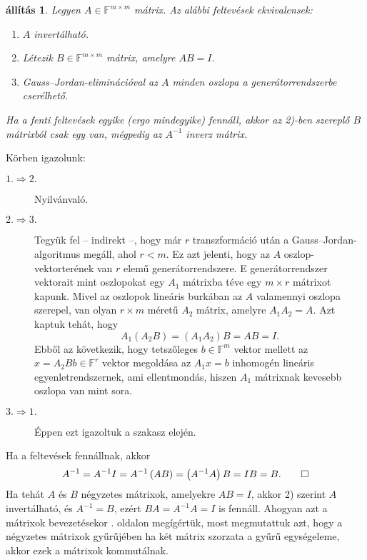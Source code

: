 \documentclass[9pt, a4paper, showtrims]{memoir}
\makeatletter
\renewenvironment{proof}[1][\proofname]
    {\par\pushQED{\qed}%
    \normalfont \topsep6\p@\@plus6\p@\relax
    \trivlist
    \item[\hskip\labelsep
        \itshape
    #1\@addpunct{:}]\ignorespaces}
    {\popQED\endtrivlist\@endpefalse}
\theoremstyle{plain}
\newtheorem{proposition}{állítás}[chapter]
\theoremstyle{remark}
\theoremstyle{definition}
\makeatother
\begin{document}
\begin{proposition}
    Legyen $A\in\mathbb{F}^{m\times m}$ mátrix. Az alábbi feltevések ekvivalensek:
    \begin{enumerate}
        \item
            $A$ invertálható.
        \item 
            Létezik $B\in\mathbb{F}^{m\times m}$ mátrix, amelyre
            \begin{math}
                AB=I.
            \end{math}
        \item 
            Gauss--Jordan-eliminációval  az $A$ minden oszlopa a generátorrendszerbe cserélhető.
    \end{enumerate}
    Ha a fenti feltevések egyike (ergo mindegyike) fennáll, 
    akkor az 2)-ben szereplő $B$ mátrixból csak egy van, 
    mégpedig az $A^{-1}$ inverz mátrix.
\end{proposition}
\begin{proof}
    Körben igazolunk:
    \begin{description}
        \item[$1.\Rightarrow 2.$] Nyilvánvaló.
        \item[$2.\Rightarrow 3.$] 
            Tegyük fel -- indirekt --, hogy már $r$ transzformáció után a Gauss--Jordan-algoritmus megáll, ahol $r<m$.
            Ez azt jelenti, hogy az $A$ oszlop-vektorterének van $r$ elemű generátorrendszere.
            E generátorrendszer vektorait mint oszlopokat egy $A_1$ mátrixba téve egy $m\times r$ mátrixot kapunk.
            Mivel az oszlopok lineáris burkában az $A$ valamennyi oszlopa szerepel,
            van olyan $r\times m$ méretű $A_2$ mátrix, amelyre 
            \(
            A_1A_2=A.
            \)
            Azt kaptuk tehát, hogy
            \[
                A_1\left( A_2B \right)=\left( A_1A_2 \right)B=AB=I.
            \]
            Ebből az következik,
            hogy tetszőleges $b\in\mathbb{F}^{m}$ vektor mellett az
            \begin{math}
                x=A_2Bb\in\mathbb{F}^{r}
            \end{math}
            vektor megoldása az $A_1x=b$ inhomogén lineáris egyenletrendszernek,
            ami ellentmondás, hiszen $A_1$ mátrixnak kevesebb oszlopa van mint sora.
        \item[$3.\Rightarrow 1.$] Éppen ezt igazoltuk a szakasz elején.
    \end{description}
    Ha a feltevések fennállnak, akkor
    \[
        A^{-1}=A^{-1}I=A^{-1}\left( AB \right)=\left( A^{-1}A \right)B=IB=B.\qedhere
    \]
\end{proof}
Ha tehát $A$ és $B$ négyzetes mátrixok, amelyekre $AB=I$,
akkor 2) szerint $A$ invertálható, és $A^{-1}=B$, ezért 
$BA=A^{-1}A=I$ is fennáll.
Ahogyan azt a mátrixok bevezetésekor . oldalon megígértük,
most megmutattuk azt, hogy a négyzetes mátrixok gyűrűjében ha két mátrix szorzata a gyűrű
egységeleme, akkor ezek a mátrixok kommutálnak.
\end{document}
